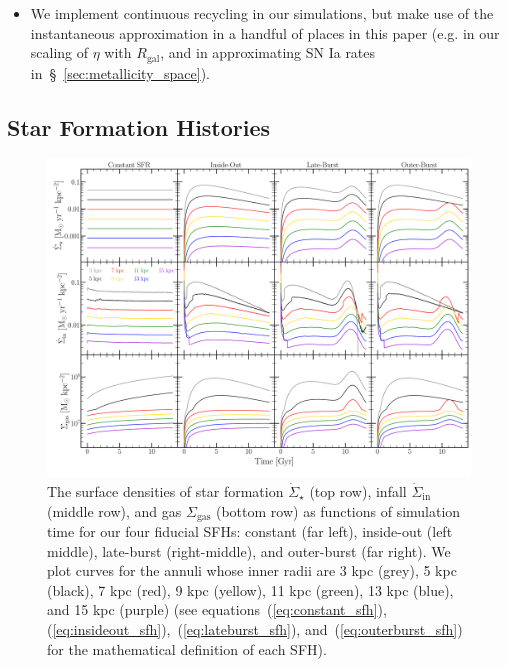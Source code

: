 \documentclass[fleqn, usenatbib]{mnras}
\newcommand{\refp}[1]{(\ref{#1})}
\begin{document}
\begin{itemize}
	\item We implement continuous recycling in our simulations, but make use 
	of the instantaneous approximation in a handful of places in this paper 
	(e.g. in our scaling of $\eta$ with $R_\text{gal}$, and in approximating 
	SN Ia rates in~\S~\ref{sec:metallicity_space}). 
\end{itemize} 

\subsection{Star Formation Histories} 
\label{sec:methods:sfhs} 

\begin{figure} 
\centering 
\includegraphics[scale = 0.32]{evol.pdf} 
\caption{The surface densities of star formation $\dot{\Sigma}_\star$ (top 
row), infall $\dot{\Sigma}_\text{in}$ (middle row), and gas $\Sigma_\text{gas}$ 
(bottom row) as functions of simulation time for our four fiducial SFHs: 
constant (far left), inside-out (left middle), late-burst (right-middle), 
and outer-burst (far right). We plot curves for the annuli whose inner radii 
are 3 kpc (grey), 5 kpc (black), 7 kpc (red), 9 kpc (yellow), 11 kpc (green), 
13 kpc (blue), and 15 kpc (purple) (see equations~\refp{eq:constant_sfh}, 
\refp{eq:insideout_sfh},~\refp{eq:lateburst_sfh}, and~\refp{eq:outerburst_sfh} 
for the mathematical definition of each SFH). } 
\label{fig:evol} 
\end{figure} 
\end{document}
